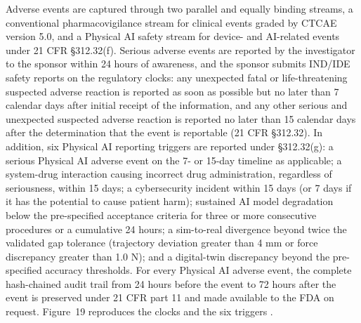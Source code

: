 Adverse events are captured through two parallel and equally binding streams, a
conventional pharmacovigilance stream for clinical events graded by CTCAE version 5.0,
and a Physical AI safety stream for device- and AI-related events under 21 CFR
\S 312.32(f). Serious adverse events are reported by the investigator to the sponsor
within 24 hours of awareness, and the sponsor submits IND/IDE safety reports on the
regulatory clocks: any unexpected fatal or life-threatening suspected adverse
reaction is reported as soon as possible but no later than 7 calendar days after
initial receipt of the information, and any other serious and unexpected suspected
adverse reaction is reported no later than 15 calendar days after the determination
that the event is reportable (21 CFR \S 312.32). In addition, six Physical AI
reporting triggers are reported under \S 312.32(g): a serious Physical AI adverse
event on the 7- or 15-day timeline as applicable; a system-drug interaction causing
incorrect drug administration, regardless of seriousness, within 15 days; a
cybersecurity incident within 15 days (or 7 days if it has the potential to cause
patient harm); sustained AI model degradation below the pre-specified acceptance
criteria for three or more consecutive procedures or a cumulative 24 hours; a
sim-to-real divergence beyond twice the validated gap tolerance (trajectory deviation
greater than 4 mm or force discrepancy greater than 1.0 N); and a digital-twin
discrepancy beyond the pre-specified accuracy thresholds. For every Physical AI
adverse event, the complete hash-chained audit trail from 24 hours before the event
to 72 hours after the event is preserved under 21 CFR part 11 and made available to
the FDA on request. Figure~19 reproduces the clocks and the six triggers
\cite{phase1guidance,cfr312paiuni}.


